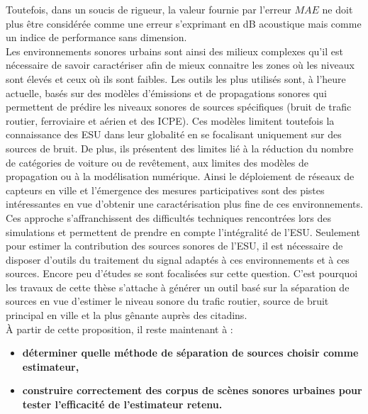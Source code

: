 Toutefois, dans un soucis de rigueur, la valeur fournie par l'erreur $MAE$ ne doit plus être considérée comme une erreur s'exprimant en dB acoustique mais comme un indice de performance sans dimension.\\

Les environnements sonores urbains sont ainsi des milieux complexes qu'il est nécessaire de savoir caractériser afin de mieux connaitre les zones où les niveaux sont élevés et ceux où ils sont faibles. 
Les outils les plus utilisés sont, à l'heure actuelle, basés sur des modèles d'émissions et de propagations sonores qui permettent de prédire les niveaux sonores de sources spécifiques (bruit de trafic routier, ferroviaire et aérien et des ICPE). Ces modèles limitent toutefois la connaissance des ESU dans leur globalité en se focalisant uniquement sur des sources de bruit. De plus, ils présentent des limites lié à la réduction du nombre de catégories de voiture ou de revêtement, aux limites des modèles de propagation ou à la modélisation numérique.  
Ainsi le déploiement de réseaux de capteurs en ville et l'émergence des mesures participatives sont des pistes intéressantes en vue d'obtenir une caractérisation plus fine de ces environnements. Ces approche s'affranchissent des difficultés techniques rencontrées lors des simulations et permettent de prendre en compte l'intégralité de l'ESU.  Seulement pour estimer la contribution des sources sonores de l'ESU, il est nécessaire de disposer d'outils du traitement du signal adaptés à ces environnements et à ces sources. 
Encore peu d'études se sont focalisées sur cette question. C'est pourquoi les travaux de cette thèse s'attache à générer un outil basé sur la séparation de sources en vue d'estimer le niveau sonore du trafic routier, source de bruit principal en ville et la plus gênante auprès des citadins.\\

À partir de cette proposition, il reste maintenant à :
\begin{itemize}
\item \textbf{déterminer quelle méthode de séparation de sources choisir comme estimateur, }
\item \textbf{construire correctement des corpus de scènes sonores urbaines pour tester l'efficacité de l'estimateur retenu.}
\end{itemize}


